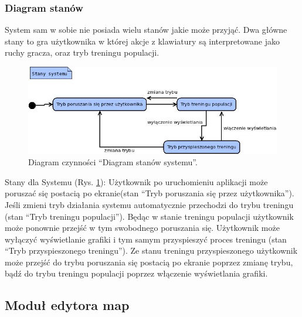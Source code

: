 \subsubsection{Diagram stanów}
\begin{par}
	System sam w sobie nie posiada wielu stanów jakie może przyjąć. Dwa główne stany to gra użytkownika w której akcje z klawiatury są interpretowane jako ruchy gracza, oraz tryb treningu populacji.
	\begin{figure}[!h]
		\centering
		\includegraphics[width=\textwidth]{obrazki/diagram_stanow.jpg}
		\caption{Diagram czynności ``Diagram stanów systemu''.}
		\label{fig:stany}
		\end{figure}
	\FloatBarrier
	Stany dla Systemu (Rys. \ref{fig:stany}):
	Użytkownik po uruchomieniu aplikacji może poruszać się postacią po ekranie(stan ``Tryb poruszania się przez użytkownika'').
	Jeśli zmieni tryb działania systemu automatycznie przechodzi do trybu treningu (stan ``Tryb treningu populacji'').
	Będąc w stanie treningu populacji użytkownik może ponownie przejść w tym swobodnego poruszania się.
	Użytkownik może wyłączyć wyświetlanie grafiki i tym samym przyspieszyć proces treningu (stan ``Tryb przyspieszonego treningu''). 
	Ze stanu treningu przyspieszonego użytkownik może przejść do trybu poruszania się postacią po ekranie poprzez zmianę trybu, bądź do trybu treningu
	populacji poprzez włączenie wyświetlania grafiki.
\end{par}

\subsection{Moduł edytora map}
